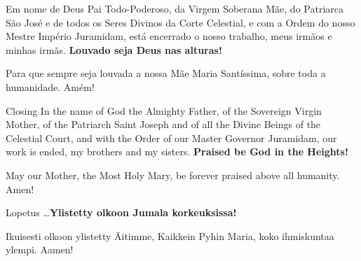   \begin{passage}[PT]{}
    Em nome de Deus Pai Todo-Poderoso, da Virgem
    Soberana Mãe, do Patriarca São José e de todos
    os Seres Divinos da Corte Celestial, e com
    a Ordem do nosso Mestre Império Juramidam,
    está encerrado o nosso trabalho, meus irmãos
    e minhas irmãs.
    \textbf{Louvado seja Deus nas alturas!}
    \par
    Para que sempre seja louvada a nossa Mãe Maria
    Santíssima, sobre toda a humanidade. Amém!
  \end{passage}
  \begin{passage}[EN]{Closing}
    In the name of God the Almighty Father, of the Sovereign
    Virgin Mother, of the Patriarch Saint Joseph and of all
    the Divine Beings of the Celestial Court, and with
    the Order of our Master Governor Juramidam,
    our work is ended, my brothers and my sisters.
    \textbf{Praised be God in the Heights!}
    \par
    May our Mother, the Most Holy Mary, be forever
    praised above all humanity. Amen!
  \end{passage}
  \begin{passage}[FI]{Lopetus}
    \ldots\textbf{Ylistetty olkoon Jumala korkeuksissa!}
    \par
    Ikuisesti olkoon ylistetty Äitimme, Kaikkein Pyhin Maria,
    koko ihmiskuntaa ylempi. Aamen!
  \end{passage}
\endsong


